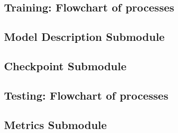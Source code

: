 \documentclass{llncs}
\begin{document}
\subsection{Training: Flowchart of processes}
\label{sec:training}

\subsection{Model Description Submodule}
\label{sec:modeldesc}

\subsection{Checkpoint Submodule}
\label{sec:checkpoint}

\subsection{Testing: Flowchart of processes}
\label{sec:testing}

\subsection{Metrics Submodule}
\label{sec:metrics}

\clearpage



\end{document}
